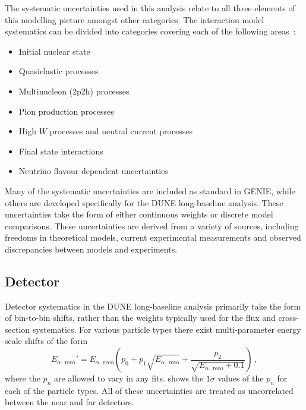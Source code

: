 
The systematic uncertainties used in this analysis relate to all three elements of this modelling picture amongst other categories.
The interaction model systematics can be divided into categories covering each of the following areas~\cite{tdrVol2}: 
\begin{itemize}
	\item Initial nuclear state
	\item Quasielastic processes
	\item Multinucleon (2p2h) processes
	\item Pion production processes
	\item High $W$ processes and neutral current processes
	\item Final state interactions
	\item Neutrino flavour dependent uncertainties
\end{itemize}

Many of the systematic uncertainties are included as standard in GENIE, while others are developed specifically for the DUNE long-baseline analysis.
These uncertainties take the form of either continuous weights or discrete model comparisons.
These uncertainties are derived from a variety of sources, including freedoms in theoretical models, current experimental measurements and observed discrepancies between models and experiments.

\subsection{Detector}
\label{sec:dune_lbl:systs:det}

Detector systematics in the DUNE long-baseline analysis primarily take the form of bin-to-bin shifts, rather than the weights typically used for the flux and cross-section systematics.
For various particle types there exist multi-parameter energy scale shifts of the form
\begin{equation}
E_{\alpha,~\text{reco}}' = E_{\alpha,~\text{reco}} \left( p_{0} + p_{1} \sqrt{E_{\alpha,~\text{reco}}} + \frac{p_{2}}{\sqrt{E_{\alpha,~\text{reco}}+0.1}} \right) \, ,
\label{eq:energyResponse}	
\end{equation}
where the $p_{n}$ are allowed to vary in any fits.
 shows the $1\sigma$ values of the $p_{n}$ for each of the particle types.
All of these uncertainties are treated as uncorrelated between the near and far detectors.

